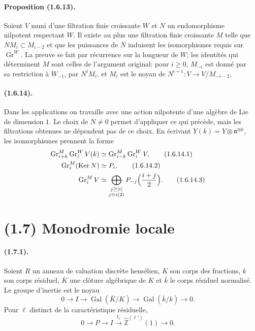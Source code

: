 \documentclass[11pt]{article}
\theoremstyle{remark}
\newcommand{\Gr}{\operatorname{Gr}}
\newcommand{\Gal}{\operatorname{Gal}}
\newcommand{\Ker}{\operatorname{Ker}}
\begin{document}
\paragraph{Proposition (1.6.13).} Soient $V$ muni d'une filtration finie croissante $W$ et $N$ un endomorphisme nilpotent respectant $W$. Il existe au plus une filtration finie croissante $M$ telle que $NM_i\subset M_{i-2}$ et que les puissances de $N$ induisent les isomorphismes requis sur $\Gr^W$. La preuve se fait par récurrence sur la longueur de $W$; les identités qui déterminent $M$ sont celles de l'argument original: pour $i\ge0$, $M_{-i}$ est donné par sa restriction à $W_{-1}$, par $N^iM_i$, et $M_i$ est le noyau de $N^{i+1}:V\to V/M_{-i-2}$.

\paragraph{(1.6.14).} Dans les applications on travaille avec une action nilpotente d'une algèbre de Lie de dimension $1$. Le choix de $N\ne0$ permet d'appliquer ce qui précède, mais les filtrations obtenues ne dépendent pas de ce choix. En écrivant $Y(k)=Y\otimes\mathfrak n^{\otimes k}$, les isomorphismes prennent la forme
\begin{align}
        \Gr^M_{i+k}\Gr^W_iV(k)&\simeq\Gr^M_{i-k}\Gr^W_iV,\tag{1.6.14.1}\\
        \Gr^M_i(\Ker N)&\simeq P_i,\tag{1.6.14.2}\\
        \Gr^M_iV&\simeq\bigoplus_{\substack{j\ge |i|\\j\equiv i(2)}}P_{-j}\Bigl(\frac{i+j}{2}\Bigr).\tag{1.6.14.3}
\end{align}

\section*{(1.7) Monodromie locale}

\paragraph{(1.7.1).} Soient $R$ un anneau de valuation discrète hensélien, $K$ son corps des fractions, $k$ son corps résiduel, $\overline K$ une clôture algébrique de $K$ et $\overline k$ le corps résiduel normalisé. Le groupe d'inertie est le noyau
\begin{equation}\tag{1.7.1.1}
0\to I\to\Gal(\overline K/K)\to\Gal(\overline k/k)\to0.
\end{equation}
Pour $\ell$ distinct de la caractéristique résiduelle,
\[
0\to P\to I\xrightarrow{t_\ell}\widehat{\mathbb Z}^{(\ell')}(1)\to0.
\]
\end{document}
